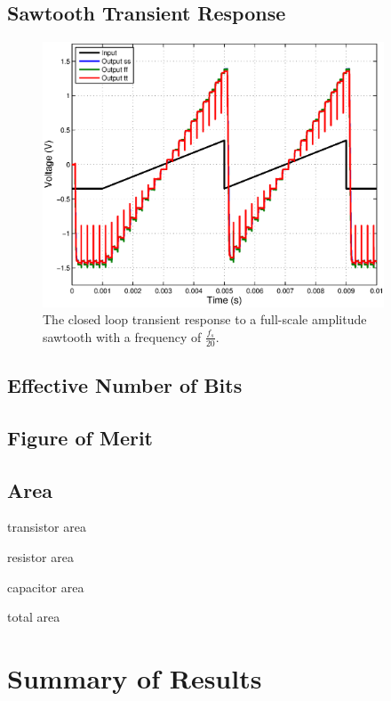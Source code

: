 \documentclass[journal]{IEEEtran}
\begin{document}
\subsection{Sawtooth Transient Response}
\begin{figure}
\centering
\includegraphics[width=4in]{Plots/closed_saw.eps}
\caption{The closed loop transient response to a full-scale amplitude sawtooth with a frequency of $\frac{f_s}{20}$.}
\label{fig:closed_saw}
\end{figure}

\subsection{Effective Number of Bits}

\subsection{Figure of Merit}

\subsection{Area}
transistor area

resistor area

capacitor area

total area

\section{Summary of Results}
\end{document}
